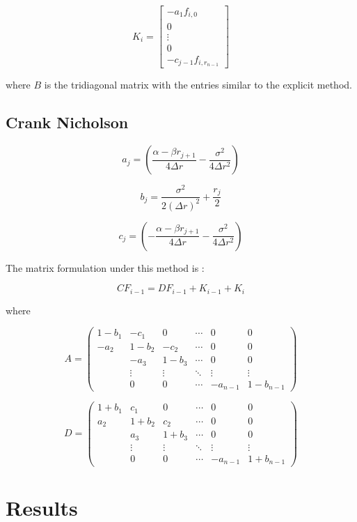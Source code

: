 \documentclass[12pt,a4paper]{article}
\begin{document}
$$K_{i}= \begin{bmatrix}
-a_{1}f_{i,0} \\
0 \\
\vdots \\
0 \\
-c_{j-1}f_{i, r_{n-1}}
\end{bmatrix}  $$

where $B$ is the tridiagonal matrix with the entries similar to the explicit method.

\subsection{Crank Nicholson}

$$a_{j}=(\frac{\alpha-\beta r_{j+1}}{4\Delta r} - \frac{\sigma^2}{4\Delta r^2}) $$

$$b_{j}= \frac{\sigma^2}{2 (\Delta r)^2}+\frac{r_{j}}{2}$$

$$c_{j}=(-\frac{\alpha-\beta r_{j+1}}{4\Delta r} - \frac{\sigma^2}{4\Delta r^2}) $$

The matrix formulation under this method is :

$$CF_{i-1}=DF_{i-1}+K_{i-1}+K_{i}$$

where

$$ A= \left( \begin{array}{cccccc}
1-b_{1} & -c_{1} & 0 & \cdots  & 0 & 0\\
-a_{2} & 1-b_{2} & -c_{2} &\cdots & 0 & 0 \\
& -a_{3} & 1-b_{3} & \cdots & 0 & 0  \\
& \vdots &\vdots & \ddots & \vdots & \vdots \\ 
& 0 & 0 & \cdots & -a_{n-1} & 1-b_{n-1} \end{array} \right) $$

$$ D= \left( \begin{array}{cccccc}
1+b_{1} & c_{1} & 0 & \cdots  & 0 & 0\\
a_{2} & 1+b_{2} & c_{2} &\cdots & 0 & 0 \\
& a_{3} & 1+b_{3} & \cdots & 0 & 0  \\
& \vdots &\vdots & \ddots & \vdots & \vdots \\ 
& 0 & 0 & \cdots & -a_{n-1} & 1+b_{n-1} \end{array} \right) $$
	
	\newpage
	\section{Results}
	\label{sec: Results}
	
\end{document}
